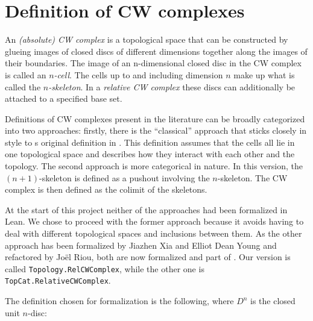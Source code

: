 \section{Definition of CW complexes}

An \emph{(absolute) CW complex} is a topological space that can be constructed by glueing images of closed discs of different dimensions together along the images of their boundaries. 
The image of an n-dimensional closed disc in the CW complex is called an \emph{$n$-cell}.
The cells up to and including dimension $n$ make up what is called the \emph{$n$-skeleton}.
In a \emph{relative CW complex} these discs can additionally be attached to a specified base set. 

Definitions of CW complexes present in the literature can be broadly categorized into two approaches: firstly, there is the ``classical'' approach that sticks closely in style to \citeauthor{Whitehead2018}s original definition in \cite{Whitehead2018}.
This definition assumes that the cells all lie in one topological space and describes how they interact with each other and the topology.
The second approach is more categorical in nature. 
In this version, the $(n + 1)$-skeleton is defined as a pushout involving the $n$-skeleton. 
The CW complex is then defined as the colimit of the skeletons. 

At the start of this project neither of the approaches had been formalized in Lean. 
We chose to proceed with the former approach because it avoids having to deal with different topological spaces and inclusions between them. 
As the other approach has been formalized by Jiazhen Xia and Elliot Dean Young and refactored by Joël Riou, both are now formalized and part of \mathlib. 
Our version is called \lstinline|Topology.RelCWComplex|, while the other one is \lstinline|TopCat.RelativeCWComplex|.

The definition chosen for formalization is the following, where $D^n$ is the closed unit $n$-disc:

